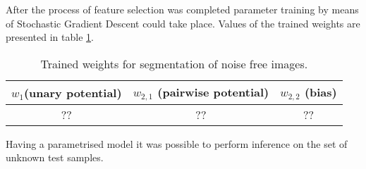After the process of feature selection was completed parameter training by means of Stochastic Gradient Descent could take place. Values of the trained weights are presented in table \ref{table:weights_nonlinear_noise_free}.
\begin{table}[ht]
\caption{Trained weights for segmentation of noise free images.}
\centering
\begin{tabular}{|c|c|c|}
\hline
\rowcolor[HTML]{C0C0C0} 
$w_1$(unary potential) & $w_{2,1}$ (pairwise potential) & $w_{2,2}$ (bias) \\ \hline
?? & ?? & ?? \\ \hline
\end{tabular}
\label{table:weights_nonlinear_noise_free}
\end{table}

Having a parametrised model it was possible to perform inference on the set of unknown test samples.
